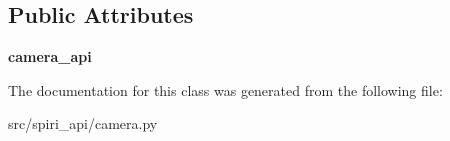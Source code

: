 \subsection*{Public Attributes}
\begin{DoxyCompactItemize}
\item 
\hypertarget{classspiri__api_1_1camera_1_1spiri__camera__interface_adfdcff4d21211d1a90984e193035594f}{{\bfseries camera\-\_\-api}}\label{classspiri__api_1_1camera_1_1spiri__camera__interface_adfdcff4d21211d1a90984e193035594f}

\end{DoxyCompactItemize}


The documentation for this class was generated from the following file\-:\begin{DoxyCompactItemize}
\item 
src/spiri\-\_\-api/camera.\-py\end{DoxyCompactItemize}
